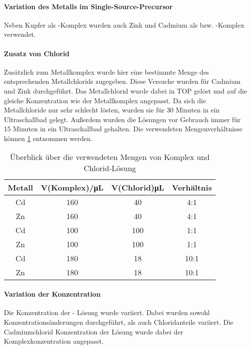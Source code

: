 				\paragraph{Variation des Metalls im Single-Source-Precursor}
				\qquad\newline
					Neben Kupfer als -Komplex wurden auch Zink und Cadmium als  bzw. -Komplex verwendet.
					
				\paragraph{Zusatz von Chlorid}
				\qquad\newline
					Zusätzlich zum Metallkomplex wurde hier eine bestimmte Menge des entsprechenden Metallchlorids zugegeben.
					Diese Versuche wurden für Cadmium und Zink durchgeführt.
					Das Metallchlorid wurde dabei in TOP gelöst und auf die gleiche Konzentration wie der Metallkomplex angepasst.
					Da sich die Metallchloride nur sehr schlecht lösten, wurden sie für 30 Minuten in ein Ultraschallbad gelegt.
					Außerdem wurden die Lösungen vor Gebrauch immer für 15 Minuten in ein Ultraschallbad gehalten. 
					Die verwendeten Mengenverhältnisse können \cref{tab:Chlorid} entnommen werden.
					
					\begin{table}[htbp]
						\centering
						\caption{Überblick über die verwendeten Mengen von Komplex und Chlorid-Lösung}
						\label{tab:Chlorid}
						\begin{tabular}{cccc}
							\toprule
							Metall & V(Komplex)/\si{\micro\liter} & V(Chlorid)\si{\micro\liter} & Verhältnis \\ 
							\midrule
							Cd & 160 & 40 & 4:1\\
							Zn & 160 & 40 & 4:1\\
							Cd & 100 & 100 & 1:1\\
							Zn & 100 & 100 & 1:1\\
							Cd & 180 & 18 & 10:1\\
							Zn & 180 & 18 & 10:1\\
							\bottomrule
						\end{tabular}
					\end{table}
				
				\paragraph{Variation der Konzentration}
				\qquad\newline
					Die Konzentration der  - Lösung wurde variiert. 
					Dabei wurden sowohl Konzentrationsänderungen durchgeführt, als auch Chloridanteile variiert.
					Die Cadmiumchlorid Konzentration der Lösung wurde dabei der Komplexkonzentration angepasst.  
					
